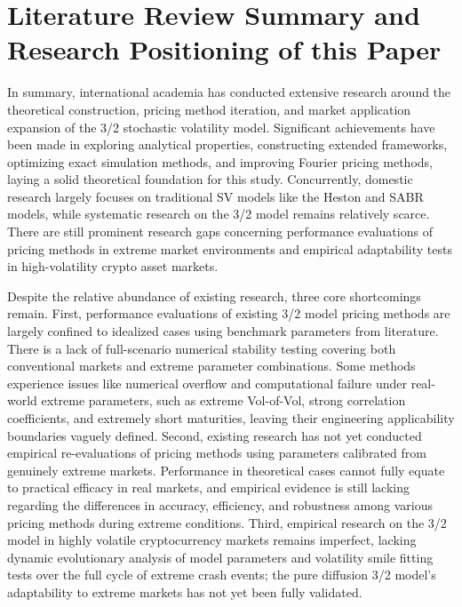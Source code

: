 \section{Literature Review Summary and Research Positioning of this Paper}

In summary, international academia has conducted extensive research around the theoretical construction, pricing method iteration, and market application expansion of the 3/2 stochastic volatility model. Significant achievements have been made in exploring analytical properties, constructing extended frameworks, optimizing exact simulation methods, and improving Fourier pricing methods, laying a solid theoretical foundation for this study. Concurrently, domestic research largely focuses on traditional SV models like the Heston and SABR models, while systematic research on the 3/2 model remains relatively scarce. There are still prominent research gaps concerning performance evaluations of pricing methods in extreme market environments and empirical adaptability tests in high-volatility crypto asset markets.

Despite the relative abundance of existing research, three core shortcomings remain. First, performance evaluations of existing 3/2 model pricing methods are largely confined to idealized cases using benchmark parameters from literature. There is a lack of full-scenario numerical stability testing covering both conventional markets and extreme parameter combinations. Some methods experience issues like numerical overflow and computational failure under real-world extreme parameters, such as extreme Vol-of-Vol, strong correlation coefficients, and extremely short maturities, leaving their engineering applicability boundaries vaguely defined. Second, existing research has not yet conducted empirical re-evaluations of pricing methods using parameters calibrated from genuinely extreme markets. Performance in theoretical cases cannot fully equate to practical efficacy in real markets, and empirical evidence is still lacking regarding the differences in accuracy, efficiency, and robustness among various pricing methods during extreme conditions. Third, empirical research on the 3/2 model in highly volatile cryptocurrency markets remains imperfect, lacking dynamic evolutionary analysis of model parameters and volatility smile fitting tests over the full cycle of extreme crash events; the pure diffusion 3/2 model's adaptability to extreme markets has not yet been fully validated.

